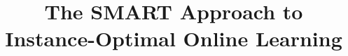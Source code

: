 \documentclass[acmsmall,screen,review]{acmart}
\begin{document}
    
    \title[The SMART Approach to Instance-Optimal Online Learning]{The SMART Approach to Instance-Optimal Online Learning}
    
    
    \begin{abstract}
        
    \end{abstract}
    
    
    
    
    \maketitle
    
    
    
    
    
    
    
    
    
    
    
    
    
    
    
    
    
\end{document}
